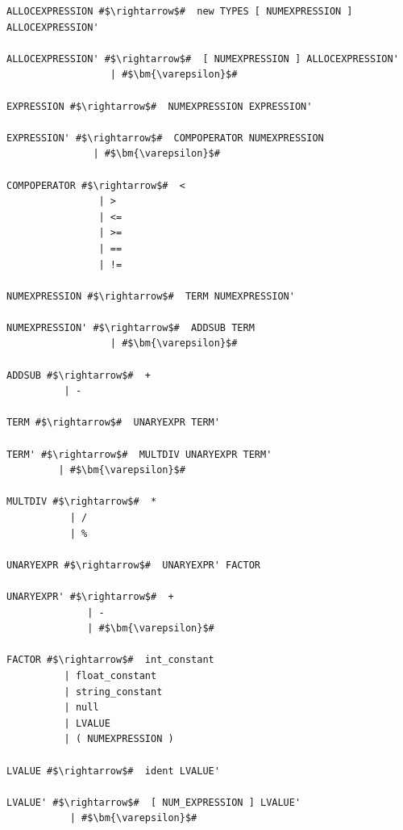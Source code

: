 \documentclass[
	12pt,				%
	openright,			%
	twoside,			%
	a4paper,			%
	english,			%
	french,				%
	spanish,			%
	brazil				%
	]{abntex2}
\begin{document}
\begin{lstlisting}[escapechar=\#]
ALLOCEXPRESSION #$\rightarrow$#  new TYPES [ NUMEXPRESSION ] ALLOCEXPRESSION' 

ALLOCEXPRESSION' #$\rightarrow$#  [ NUMEXPRESSION ] ALLOCEXPRESSION' 
                  | #$\bm{\varepsilon}$# 

EXPRESSION #$\rightarrow$#  NUMEXPRESSION EXPRESSION' 

EXPRESSION' #$\rightarrow$#  COMPOPERATOR NUMEXPRESSION 
               | #$\bm{\varepsilon}$# 

COMPOPERATOR #$\rightarrow$#  < 
                | > 
                | <= 
                | >= 
                | == 
                | != 

NUMEXPRESSION #$\rightarrow$#  TERM NUMEXPRESSION' 

NUMEXPRESSION' #$\rightarrow$#  ADDSUB TERM 
                  | #$\bm{\varepsilon}$# 

ADDSUB #$\rightarrow$#  + 
          | - 

TERM #$\rightarrow$#  UNARYEXPR TERM' 

TERM' #$\rightarrow$#  MULTDIV UNARYEXPR TERM' 
         | #$\bm{\varepsilon}$# 

MULTDIV #$\rightarrow$#  * 
           | / 
           | % 

UNARYEXPR #$\rightarrow$#  UNARYEXPR' FACTOR 

UNARYEXPR' #$\rightarrow$#  + 
              | - 
              | #$\bm{\varepsilon}$# 

FACTOR #$\rightarrow$#  int_constant 
          | float_constant 
          | string_constant 
          | null 
          | LVALUE 
          | ( NUMEXPRESSION ) 

LVALUE #$\rightarrow$#  ident LVALUE' 

LVALUE' #$\rightarrow$#  [ NUM_EXPRESSION ] LVALUE' 
           | #$\bm{\varepsilon}$#    
           
\end{lstlisting}
\end{document}
